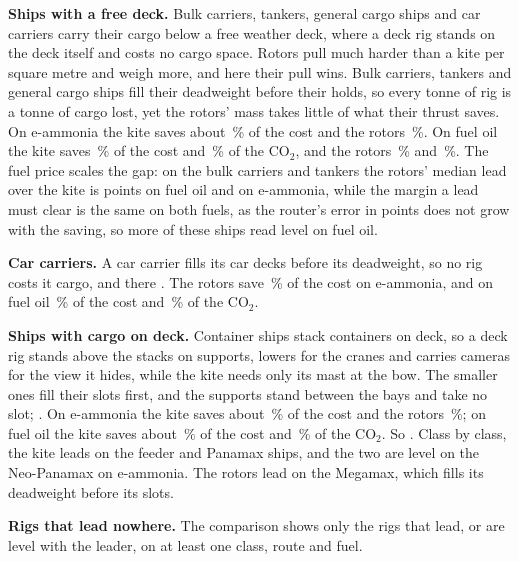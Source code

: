 \documentclass[10pt,a4paper]{article}
\begin{document}
\textbf{Ships with a free deck.} Bulk carriers, tankers, general cargo ships and car carriers carry their cargo below a free weather deck, where a deck rig stands on the deck itself and costs no cargo space. Rotors pull much harder than a kite per square metre and weigh more, and here their pull wins. Bulk carriers, tankers and general cargo ships fill their deadweight before their holds, so every tonne of rig is a tonne of cargo lost, yet the rotors' mass takes little of what their thrust saves. On e-ammonia the kite saves about \NumSavingAmmoniaBulkKite\,\% of the cost and the rotors \NumSavingAmmoniaBulkRotors\,\%. On fuel oil the kite saves \NumSavingOilBulkKite\,\% of the cost and \NumCarbonBulkKite\,\% of the CO$_2$, and the rotors \NumSavingOilBulkRotors\,\% and \NumCarbonBulkRotors\,\%. The fuel price scales the gap: on the bulk carriers and tankers the rotors' median lead over the kite is \NumRotorLeadBulkTankerOil{} points on fuel oil and \NumRotorLeadBulkTankerAmmonia{} on e-ammonia, while the margin a lead must clear is the same on both fuels, as the router's error in points does not grow with the saving, so more of these ships read level on fuel oil.

\textbf{Car carriers.} A car carrier fills its car decks before its deadweight, so no rig costs it cargo, and there \NumVerdictCarCarrier{}. The rotors save \NumSavingAmmoniaCarCarrierRotors\,\% of the cost on e-ammonia, and on fuel oil \NumSavingOilCarCarrierRotors\,\% of the cost and \NumCarbonCarCarrierRotors\,\% of the CO$_2$.

\textbf{Ships with cargo on deck.} Container ships stack containers on deck, so a deck rig stands above the stacks on supports, lowers for the cranes and carries cameras for the view it hides, while the kite needs only its mast at the bow. The smaller ones fill their slots first, and the supports stand between the bays and take no slot; . On e-ammonia the kite saves about \NumSavingAmmoniaContainerKite\,\% of the cost and the rotors \NumSavingAmmoniaContainerRotors\,\%; on fuel oil the kite saves about \NumSavingOilContainerKite\,\% of the cost and \NumCarbonContainerKite\,\% of the CO$_2$. So \NumVerdictContainer{}. Class by class, the kite leads on the feeder and Panamax ships, and the two are level on the Neo-Panamax on e-ammonia. The rotors lead on the Megamax, which fills its deadweight before its slots.

\textbf{Rigs that lead nowhere.} The comparison shows only the rigs that lead, or are level with the leader, on at least one class, route and fuel. \NumTrailing{}
\end{document}
